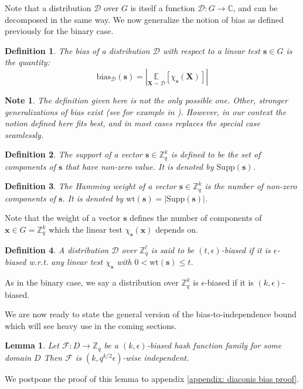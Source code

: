 \documentclass[12pt]{article}
\newtheorem{definition}{Definition}[section]
\newtheorem{lemma}[theorem]{Lemma}
\newtheorem{note}[theorem]{Note}
\newcommand{\Supp}[1]{\mathrm{Supp}\left(#1\right)}
\newcommand{\bias}[2]{\mathrm{bias}_{#1}\left(#2\right)}
\newcommand{\dist}{\mathcal{D}}
\newcommand{\C}{\mathbb{C}}
\newcommand{\E}{\mathbb{E}}
\newcommand{\F}{\mathcal{F}}
\newcommand{\Z}{\mathbb{Z}}
\newcommand{\abs}[1]{\left| #1 \right|}
\renewcommand{\vec}[1]{\bm{#1}}
\newcommand{\wt}[1]{\mathrm{wt}\left(#1\right)}
\begin{document}
	Note that a distribution $\dist$ over $G$ is itself a function $\dist : G \rightarrow \C$, and can be decomposed in the same way.
	We now generalize the notion of bias as defined previously for the binary case.
	
	\begin{definition}
		The \emph{bias} of a distribution $\dist$ with respect to a linear test $\vec{s} \in G$ is the quantity:
		\begin{equation*}
			\bias{\dist}{\vec{s}} = \abs{ \underset{\vec{X} \sim \dist}{\E} \left[  \chi_{\vec{s}}(\vec{X}) \right] }
		\end{equation*}
	\end{definition}
	
	\begin{note}
		The definition given here is not the only possible one.
		Other, stronger generalizations of bias exist (see for example in \cite{GeneralBias}).
		However, in our context the notion defined here fits best, and in most cases replaces the special case seamlessly.
	\end{note}
	
	\begin{definition}
		The \emph{support} of a vector $\vec{s} \in \Z_q^k$ is defined to be the set of components of $\vec{s}$ that have non-zero value.
		It is denoted by $\Supp{\vec{s}}$.
	\end{definition}
	
	\begin{definition}
		The \emph{Hamming weight} of a vector $\vec{s} \in \Z_q^k$ is the number of non-zero components of $\vec{s}$.
		It is denoted by $\wt{\vec{s}} = \abs{\Supp{\vec{s}}}$.
	\end{definition}
	
	Note that the weight of a vector $\vec{s}$ defines the number of components of $\vec{x} \in G = \Z_q^k$ which the linear test $\chi_{\vec{s}}(\vec{x})$ depends on.
	
	\begin{definition}
		A distribution $\dist$ over $\Z_q^l$ is said to be $(t, \epsilon)$-biased if it is $\epsilon$-biased w.r.t. any linear test $\chi_{\vec{s}}$ with $0 < \wt{\vec{s}} \leq t$.
	\end{definition}
	As in the binary case, we say a distribution over $\Z_q^k$ is $\epsilon$-biased if it is $(k, \epsilon)$-biased.
	
	We are now ready to state the general version of the bias-to-independence bound which will see heavy use in the coming sections.
	\begin{lemma} \label{lemma: diaconis bias general case}
		Let $\F : D \rightarrow \Z_q $ be a $(k, \epsilon)$-biased hash function family for some domain $D$
		Then $\F$ is $(k, q^{k/2} \epsilon)$-wise independent.
	\end{lemma}
	We postpone the proof of this lemma to appendix \ref{appendix: diaconis bias proof}.
	
\end{document}
